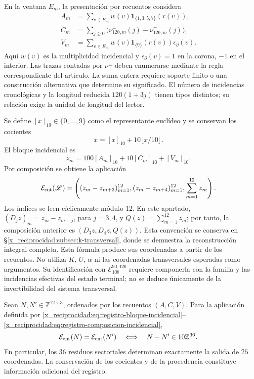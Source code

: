 En la ventana \(E_m\), la presentación por recuentos considera
\begin{align}
 A_m&=\sum_{v\in E_m}w(v)
             \mathbf1_{\{1,3,5,7\}}(r(v)),\\
 C_m&=\sum_{j\geq0}\bigl(\nu^-_{120,m}(j)-\nu^+_{120,m}(j)\bigr),\\
 V_m&=\sum_{v\in E_m}w(v)\mathbf1_{\{9\}}(r(v))\epsilon_\partial(v).
\end{align}
Aquí \(w(v)\) es la multiplicidad incidencial y
\(\epsilon_\partial(v)=1\) en la corona, \(-1\) en el interior.
Las trazas contadas por \(\nu^\pm\) deben enumerarse mediante la regla
correspondiente del artículo. La suma entera requiere soporte finito o una
construcción alternativa que determine su significado. El número de
incidencias cronológicas y la longitud reducida \(120(1+3j)\) tienen
tipos distintos; su relación exige la unidad de longitud del lector.

Se define \([x]_{10}\in\{0,\ldots,9\}\) como el representante
euclídeo y se conservan los cocientes
\[
 x=[x]_{10}+10\lfloor x/10\rfloor.
\]
El bloque incidencial es
\begin{equation}
 z_m=100[A_m]_{10}+10[C_m]_{10}+[V_m]_{10}.
 \label{x_reciprocidad:eq:registro-bloque-incidencial}
\end{equation}
Por composición se obtiene la aplicación
\begin{equation}
 \mathcal E_{\rm cnt}(\mathscr L)=
 \left((z_m-z_{m+3})_{m=1}^{12},
       (z_m-z_{m+4})_{m=1}^{12},\sum_{m=1}^{12}z_m\right).
\label{x_reciprocidad:eq:registro-composicion-incidencial}
\end{equation}
Los índices se leen cíclicamente módulo \(12\). En este apartado,
\((D_jz)_m=z_m-z_{m+j}\), para \(j=3,4\), y
\(Q(z)=\sum_{m=1}^{12}z_m\); por tanto, la composición anterior es
\((D_3z,D_4z,Q(z))\). Esta convención se conserva en
\S\ref{x_reciprocidad:subsec:k-transversal}, donde se demuestra la reconstrucción
integral completa.
Esta fórmula produce sus coordenadas a partir de los recuentos. No utiliza
\(K\), \(U\), \(\alpha\) ni las coordenadas transversales esperadas
como argumentos. Su identificación con
\(\mathcal E_{108}^{90,120}\) requiere componerla con la familia y
las incidencias efectivas del estado terminal; no se deduce únicamente
de la invertibilidad del sistema transversal.

\begin{proposition}
\label{x_reciprocidad:prop:registro-36-residuos}
Sean \(N,N'\in\mathbb Z^{12\times3}\), ordenados por los recuentos
\((A,C,V)\). Para la aplicación definida por
\eqref{x_reciprocidad:eq:registro-bloque-incidencial}--\eqref{x_reciprocidad:eq:registro-composicion-incidencial},
\[
 \mathcal E_{\rm cnt}(N)=\mathcal E_{\rm cnt}(N')
 \quad\Longleftrightarrow\quad
 N-N'\in10\mathbb Z^{36}.
\]
En particular, los \(36\) residuos sectoriales determinan exactamente
la salida de \(25\) coordenadas. La conservación de los cocientes y
de la procedencia constituye información adicional del registro.
\end{proposition}


